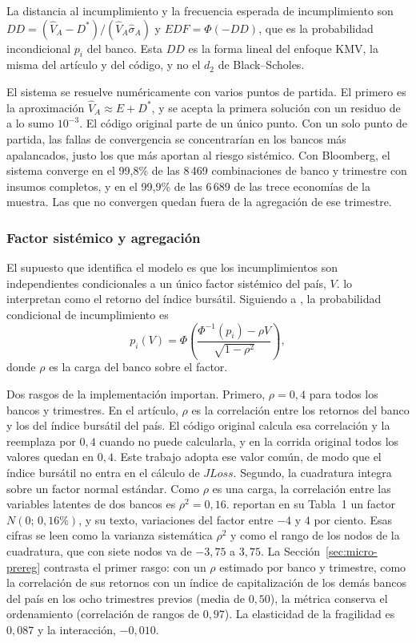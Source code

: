 La distancia al incumplimiento y la frecuencia esperada de incumplimiento son $DD=(\hat V_A-D^{*})/(\hat V_A\hat\sigma_A)$ y $EDF=\Phi(-DD)$, que es la probabilidad incondicional $p_i$ del banco. Esta $DD$ es la forma lineal del enfoque KMV, la misma del artículo y del código, y no el $d_2$ de Black--Scholes.

El sistema se resuelve numéricamente con varios puntos de partida. El primero es la aproximación $\hat V_A\approx E+D^{*}$, y se acepta la primera solución con un residuo de a lo sumo $10^{-3}$. El código original parte de un único punto. Con un solo punto de partida, las fallas de convergencia se concentrarían en los bancos más apalancados, justo los que más aportan al riesgo sistémico. Con Bloomberg, el sistema converge en el 99,8\% de las 8\,469 combinaciones de banco y trimestre con insumos completos, y en el 99,9\% de las 6\,689 de las trece economías de la muestra. Las que no convergen quedan fuera de la agregación de ese trimestre.

\subsubsection{Factor sistémico y agregación}

El supuesto que identifica el modelo es que los incumplimientos son independientes condicionales a un único factor sistémico del país, $V$. \citet{Chari2024b} lo interpretan como el retorno del índice bursátil. Siguiendo a \citet{Vasicek1997}, la probabilidad condicional de incumplimiento es
\[ p_i(V)=\Phi\!\left(\frac{\Phi^{-1}(p_i)-\rho V}{\sqrt{1-\rho^2}}\right), \]
donde $\rho$ es la carga del banco sobre el factor.

Dos rasgos de la implementación importan. Primero, $\rho=0{,}4$ para todos los bancos y trimestres. En el artículo, $\rho$ es la correlación entre los retornos del banco y los del índice bursátil del país. El código original calcula esa correlación y la reemplaza por $0{,}4$ cuando no puede calcularla, y en la corrida original todos los valores quedan en $0{,}4$. Este trabajo adopta ese valor común, de modo que el índice bursátil no entra en el cálculo de $JLoss$. Segundo, la cuadratura integra sobre un factor normal estándar. Como $\rho$ es una carga, la correlación entre las variables latentes de dos bancos es $\rho^2=0{,}16$. \citet{Chari2024b} reportan en su Tabla~1 un factor $N(0;\,0{,}16\%)$, y su texto, variaciones del factor entre $-4$ y $4$ por ciento. Esas cifras se leen como la varianza sistemática $\rho^2$ y como el rango de los nodos de la cuadratura, que con siete nodos va de $-3{,}75$ a $3{,}75$. La Sección~\ref{sec:micro-prereg} contrasta el primer rasgo: con un $\rho$ estimado por banco y trimestre, como la correlación de sus retornos con un índice de capitalización de los demás bancos del país en los ocho trimestres previos (media de $0{,}50$), la métrica conserva el ordenamiento (correlación de rangos de $0{,}97$). La elasticidad de la fragilidad es $0{,}087$ y la interacción, $-0{,}010$.

